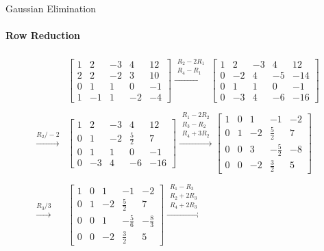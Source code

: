 \documentclass{beamer}
\begin{document}
\begin{frame}{Gaussian Elimination}
\framesubtitle{Row Reduction}
{\tiny 
\begin{align*}
&
\left[ 
    \begin{array}{cccc|c}
    1 & 2 & -3 & 4 & 12 \\
    2 & 2 & -2 & 3 & 10 \\
    0 & 1 & 1 & 0 & -1 \\
    1 & -1 & 1 & -2 & -4
    \end{array}
\right]
\xrightarrow{\substack{R_2 - 2R_1 \\ R_4 - R_1}}
\left[ 
    \begin{array}{cccc|c}
    1 & 2 & -3 & 4 & 12 \\
    0 & -2 & 4 & -5 & -14 \\
    0 & 1 & 1 & 0 & -1 \\
    0 & -3 & 4 & -6 & -16
    \end{array}
\right] \\ \\
\xrightarrow{R_2/-2}
&\left[ 
    \begin{array}{cccc|c}
    1 & 2 & -3 & 4 & 12 \\
    0 & 1 & -2 & \frac{5}{2} & 7 \\
    0 & 1 & 1 & 0 & -1 \\
    0 & -3 & 4 & -6 & -16
    \end{array}
\right]
\xrightarrow{\substack{R_1 - 2R_2 \\ R_3 - R_2 \\ R_4 + 3R_2}}
\left[ 
    \begin{array}{cccc|c}
    1 & 0 & 1 & -1 & -2 \\
    0 & 1 & -2 & \frac{5}{2} & 7 \\
    0 & 0 & 3 & -\frac{5}{2} & -8 \\
    0 & 0 & -2 & \frac{3}{2} & 5
    \end{array}
\right] \\ \\ 
\xrightarrow{R_3/3}
&\left[ 
    \begin{array}{cccc|c}
    1 & 0 & 1 & -1 & -2 \\
    0 & 1 & -2 & \frac{5}{2} & 7 \\
    0 & 0 & 1 & -\frac{5}{6} & -\frac{8}{3} \\
    0 & 0 & -2 & \frac{3}{2} & 5
    \end{array}
\right]
\xrightarrow{\substack{R_1 - R_3 \\ R_2 + 2R_3 \\ R_4 + 2R_3}}

\end{align*}}
\end{frame}
\end{document}
